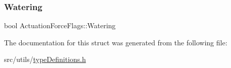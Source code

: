 \subsubsection{\texorpdfstring{Watering}{Watering}}
{\footnotesize\ttfamily bool Actuation\+Force\+Flags\+::\+Watering}



The documentation for this struct was generated from the following file\+:\begin{DoxyCompactItemize}
\item 
src/utils/\hyperlink{typeDefinitions_8h}{type\+Definitions.\+h}\end{DoxyCompactItemize}
